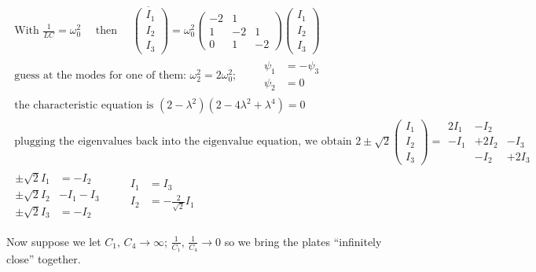 \documentclass[twoside,10pt]{amsart}
\begin{document}
\[
\begin{gathered}
\text{ With } \frac{1}{LC} = \omega_0^2 \quad \text{ then } \quad \ddot{ \left( \begin{matrix} I_1 \\ I_2 \\ I_3 \end{matrix} \right) } = \omega_0^2 \left( \begin{matrix} - 2 & 1 &  \\ 1 & -2 & 1 \\ 0 & 1 & -2 \end{matrix} \right) \left( \begin{matrix} I_1 \\ I_2 \\ I_3 \end{matrix} \right) \\
\text{ guess at the modes for one of them: } \omega_2^2 = 2 \omega_0^2 ; \quad \quad \begin{aligned} \psi_1 & = - \psi_3 \\
  \psi_2 & = 0 \end{aligned} \\
\text{ the characteristic equation is } (2- \lambda^2)(2 - 4 \lambda^2 + \lambda^4) = 0 \\
\text{ plugging the eigenvalues back into the eigenvalue equation, we obtain } 2 \pm \sqrt{2} \left( \begin{matrix} I_1 \\ I_2 \\ I_3 \end{matrix} \right) = \begin{matrix} 2 I_1 & - I_2 & \\ -I_1 & + 2 I_2 & - I_3 \\ & -I_2 & + 2 I_3 \end{matrix} \\
\boxed{ \begin{aligned} \pm \sqrt{2} I_1 & = - I_2 \\ \pm \sqrt{2} I_2 & -I_1 -I_3 \\ \pm \sqrt{2} I_3 & = -I_2 \end{aligned} \quad \quad \begin{aligned} I_1 & = I_3 \\ I_2 & = -\frac{2}{ \sqrt{2} } I_1 \end{aligned} }
\end{gathered}
\]

Now suppose we let $C_1, \, C_4 \to \infty$; \quad $\frac{1}{C_1}, \, \frac{1}{C_4} \to 0$ so we bring the plates ``infinitely close'' together.  
\end{document}
